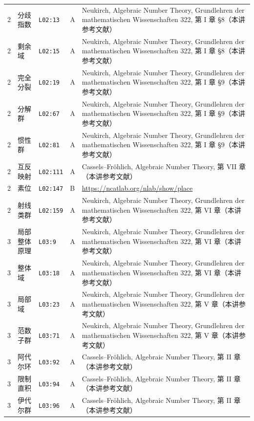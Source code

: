 \begin{longtable}{@{}p{1.0cm}p{3.3cm}p{1.5cm}p{1.3cm}p{7.9cm}@{}}
2 & 分歧指数 & \texttt{L02:13} & A & Neukirch, Algebraic Number Theory, Grundlehren der mathematischen Wissenschaften 322, 第 I 章 §8（本讲参考文献） \\
2 & 剩余域 & \texttt{L02:15} & A & Neukirch, Algebraic Number Theory, Grundlehren der mathematischen Wissenschaften 322, 第 I 章 §8（本讲参考文献） \\
2 & 完全分裂 & \texttt{L02:19} & A & Neukirch, Algebraic Number Theory, Grundlehren der mathematischen Wissenschaften 322, 第 I 章 §9（本讲参考文献） \\
2 & 分解群 & \texttt{L02:67} & A & Neukirch, Algebraic Number Theory, Grundlehren der mathematischen Wissenschaften 322, 第 I 章 §9（本讲参考文献） \\
2 & 惯性群 & \texttt{L02:81} & A & Neukirch, Algebraic Number Theory, Grundlehren der mathematischen Wissenschaften 322, 第 I 章 §9（本讲参考文献） \\
2 & 互反映射 & \texttt{L02:111} & A & Cassels--Fröhlich, Algebraic Number Theory, 第 VII 章（本讲参考文献） \\
2 & 素位 & \texttt{L02:147} & B & \url{https://ncatlab.org/nlab/show/place} \\
2 & 射线类群 & \texttt{L02:159} & A & Neukirch, Algebraic Number Theory, Grundlehren der mathematischen Wissenschaften 322, 第 VI 章（本讲参考文献） \\
\midrule
3 & 局部整体原理 & \texttt{L03:9} & A & Neukirch, Algebraic Number Theory, Grundlehren der mathematischen Wissenschaften 322, 第 VI 章（本讲参考文献） \\
3 & 整体域 & \texttt{L03:18} & A & Neukirch, Algebraic Number Theory, Grundlehren der mathematischen Wissenschaften 322, 第 VI 章（本讲参考文献） \\
3 & 局部域 & \texttt{L03:23} & A & Neukirch, Algebraic Number Theory, Grundlehren der mathematischen Wissenschaften 322, 第 V 章（本讲参考文献） \\
3 & 范数子群 & \texttt{L03:71} & A & Neukirch, Algebraic Number Theory, Grundlehren der mathematischen Wissenschaften 322, 第 V 章（本讲参考文献） \\
3 & 阿代尔环 & \texttt{L03:92} & A & Cassels–Fröhlich, Algebraic Number Theory, 第 II 章（本讲参考文献） \\
3 & 限制直积 & \texttt{L03:94} & A & Cassels–Fröhlich, Algebraic Number Theory, 第 II 章（本讲参考文献） \\
3 & 伊代尔群 & \texttt{L03:96} & A & Cassels–Fröhlich, Algebraic Number Theory, 第 II 章（本讲参考文献） \\

\end{longtable}
